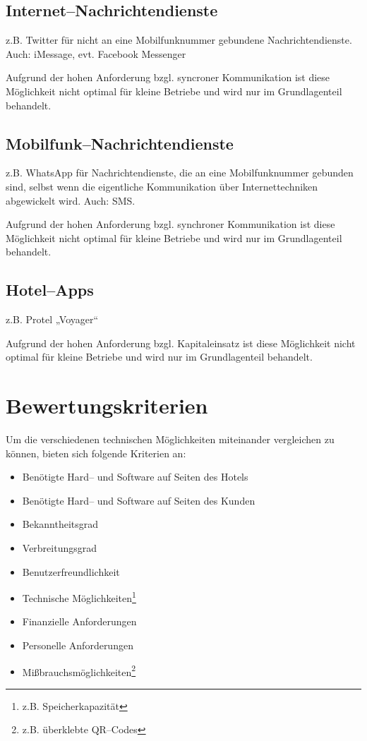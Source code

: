 \subsection{Internet--Nachrichtendienste}

z.B. Twitter für nicht an eine Mobilfunknummer gebundene Nachrichtendienste. Auch: iMessage, evt. Facebook Messenger

Aufgrund der hohen Anforderung bzgl. syncroner Kommunikation ist diese Möglichkeit nicht optimal für kleine Betriebe und wird nur im Grundlagenteil behandelt.

\subsection{Mobilfunk--Nachrichtendienste}

z.B. WhatsApp für Nachrichtendienste, die an eine Mobilfunknummer gebunden sind, selbst wenn die eigentliche Kommunikation über Internettechniken abgewickelt wird. Auch: SMS.

Aufgrund der hohen Anforderung bzgl. synchroner Kommunikation ist diese Möglichkeit nicht optimal für kleine Betriebe und wird nur im Grundlagenteil behandelt.

\subsection{Hotel--Apps}

z.B. Protel „Voyager“

Aufgrund der hohen Anforderung bzgl. Kapitaleinsatz ist diese Möglichkeit nicht optimal für kleine Betriebe und wird nur im Grundlagenteil behandelt.

\section{Bewertungskriterien}
\label{sec:kriterien}

Um die verschiedenen technischen Möglichkeiten miteinander vergleichen zu können, bieten sich folgende Kriterien an:

\begin{itemize}
\item Benötigte Hard-- und Software auf Seiten des Hotels
\item Benötigte Hard-- und Software auf Seiten des Kunden
\item Bekanntheitsgrad 
\item Verbreitungsgrad 
\item Benutzerfreundlichkeit
\item Technische Möglichkeiten\footnote{z.B. Speicherkapazität}
\item Finanzielle Anforderungen
\item Personelle Anforderungen
\item Mißbrauchsmöglichkeiten\footnote{z.B. überklebte QR--Codes}
\end{itemize}